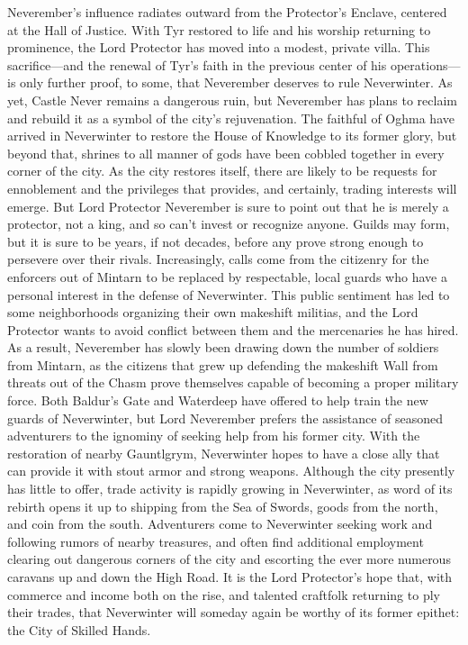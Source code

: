 \documentclass[10pt,a4paper,twoside,twocolumn,openany,bg=print,nodeprecatedcode]{dndbook}
\begin{document}
Neverember's influence radiates outward from the Protector's Enclave, centered at the Hall of Justice. With Tyr restored to life and his worship returning to prominence, the Lord Protector has moved into a modest, private villa. This sacrifice—and the renewal of Tyr's faith in the previous center of his operations—is only further proof, to some, that Neverember deserves to rule Neverwinter. As yet, Castle Never remains a dangerous ruin, but Neverember has plans to reclaim and rebuild it as a symbol of the city's rejuvenation.
The faithful of Oghma have arrived in Neverwinter to restore the House of Knowledge to its former glory, but beyond that, shrines to all manner of gods have been cobbled together in every corner of the city.
As the city restores itself, there are likely to be requests for ennoblement and the privileges that provides, and certainly, trading interests will emerge. But Lord Protector Neverember is sure to point out that he is merely a protector, not a king, and so can't invest or recognize anyone. Guilds may form, but it is sure to be years, if not decades, before any prove strong enough to persevere over their rivals.
Increasingly, calls come from the citizenry for the enforcers out of Mintarn to be replaced by respectable, local guards who have a personal interest in the defense of Neverwinter. This public sentiment has led to some neighborhoods organizing their own makeshift militias, and the Lord Protector wants to avoid conflict between them and the mercenaries he has hired. As a result, Neverember has slowly been drawing down the number of soldiers from Mintarn, as the citizens that grew up defending the makeshift Wall from threats out of the Chasm prove themselves capable of becoming a proper military force. Both Baldur's Gate and Waterdeep have offered to help train the new guards of Neverwinter, but Lord Neverember prefers the assistance of seasoned adventurers to the ignominy of seeking help from his former city.
With the restoration of nearby Gauntlgrym, Neverwinter hopes to have a close ally that can provide it with stout armor and strong weapons. Although the city presently has little to offer, trade activity is rapidly growing in Neverwinter, as word of its rebirth opens it up to shipping from the Sea of Swords, goods from the north, and coin from the south. Adventurers come to Neverwinter seeking work and following rumors of nearby treasures, and often find additional employment clearing out dangerous corners of the city and escorting the ever more numerous caravans up and down the High Road. It is the Lord Protector's hope that, with commerce and income both on the rise, and talented craftfolk returning to ply their trades, that Neverwinter will someday again be worthy of its former epithet: the City of Skilled Hands.
\end{document}
